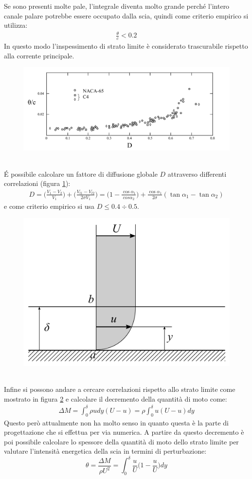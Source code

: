 Se sono presenti molte pale, l'integrale diventa molto grande perché l'intero canale palare potrebbe essere occupato dalla scia, quindi come criterio empirico si utilizza:
\begin{align*}
\frac{\theta}{c} < 0.2
\end{align*}
In questo modo l'inspessimento di strato limite è considerato trascurabile rispetto alla corrente principale. 
\begin{figure}
\centering
  \includegraphics[width=\textwidth]{fig/CritCarico3.pdf}
\caption{}
\label{fig:CritCarico3}
\end{figure}
\\\'E possibile calcolare un fattore di diffusione globale $D$ attraverso differenti correlazioni (figura \ref{fig:CritCarico3}):
\begin{align*}
D = \bigg( \frac{V_1 - V_2}{V_1} \bigg) + \bigg( \frac{V_{t1} - V_{t2}}{2 \sigma V_1} \bigg) = \bigg( 1 - \frac{\cos \alpha_1}{cos \alpha_2} \bigg) + \frac{\cos \alpha_1}{2 \sigma} (\tan \alpha_1 - \tan \alpha_2)
\end{align*}
e come criterio empirico si usa $ D \leqslant 0.4 \div 0.5  $.
\begin{figure}
\centering
  \includegraphics[width=.4\textwidth]{fig/CritCarico4.pdf}
\caption{}
\label{fig:CritCarico4}
\end{figure}
\\Infine si possono andare a cercare correlazioni rispetto allo strato limite come mostrato in figura \ref{fig:CritCarico4} e calcolare il decremento della quantità di moto come:
\begin{align*}
\Delta M = \int_0^{\delta} \rho u dy (U-u) = \rho \int_0^{\delta} u (U-u) dy
\end{align*} 
Questo però attualmente non ha molto senso in quanto questa è la parte di progettazione che si effettua per via numerica. A partire da questo decremento è poi possibile calcolare lo spessore della quantità di moto dello strato limite per valutare l'intensità energetica della scia in termini di perturbazione:
\begin{equation}
\theta = \frac{\Delta M}{\rho U^2} = \int_0^{\delta} \frac{u}{U} \bigg( 1 -\frac{u}{U} \bigg) dy
\end{equation}

